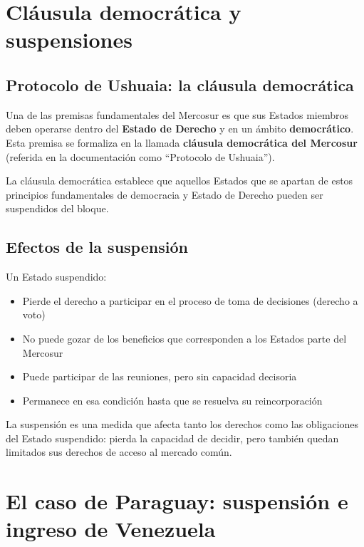 \documentclass[12pt,oneside]{book}
\begin{document}
\section{Cláusula democrática y suspensiones}

\subsection{Protocolo de Ushuaia: la cláusula democrática}

Una de las premisas fundamentales del Mercosur es que sus Estados miembros deben operarse dentro del \textbf{Estado de Derecho} y en un ámbito \textbf{democrático}. Esta premisa se formaliza en la llamada \textbf{cláusula democrática del Mercosur} (referida en la documentación como ``Protocolo de Ushuaia'').

La cláusula democrática establece que aquellos Estados que se apartan de estos principios fundamentales de democracia y Estado de Derecho pueden ser suspendidos del bloque.

\subsection{Efectos de la suspensión}

Un Estado suspendido:

\begin{itemize}
\item Pierde el derecho a participar en el proceso de toma de decisiones (derecho a voto)
\item No puede gozar de los beneficios que corresponden a los Estados parte del Mercosur
\item Puede participar de las reuniones, pero sin capacidad decisoria
\item Permanece en esa condición hasta que se resuelva su reincorporación
\end{itemize}

\begin{important}
La suspensión es una medida que afecta tanto los derechos como las obligaciones del Estado suspendido: pierda la capacidad de decidir, pero también quedan limitados sus derechos de acceso al mercado común.
\end{important}

\section{El caso de Paraguay: suspensión e ingreso de Venezuela}
\end{document}
